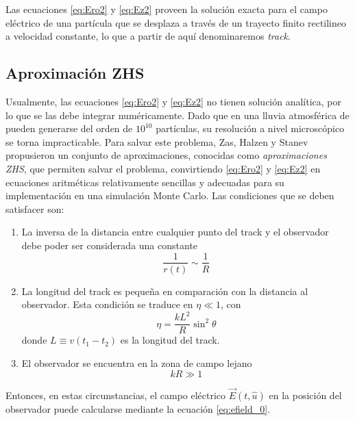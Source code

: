 Las ecuaciones \ref{eq:Ero2} y \ref{eq:Ez2} proveen la soluci\'on exacta para el campo el\'ectrico de una part\'icula que se desplaza a trav\'es de un trayecto finito rectilineo a velocidad constante, lo que a partir de aqu\'i denominaremos \emph{track}.

\subsection{Aproximaci\'on ZHS}
\label{sbsc:zhs_approx}

Usualmente, las ecuaciones \ref{eq:Ero2} y \ref{eq:Ez2} no tienen soluci\'on anal\'itica, por lo que se las debe integrar num\'ericamente.
Dado que en una lluvia atmosf\'erica de  pueden generarse del orden de $10^{10}$ part\'iculas, su resoluci\'on a nivel microsc\'opico se torna impracticable.
Para salvar este problema, Zas, Halzen y Stanev~\cite{1_halzen_zas_stanev_1991,2_zas_halzen_stanev_1992} propusieron un conjunto de aproximaciones, conocidas como \emph{aproximaciones ZHS}, que permiten salvar el problema, convirtiendo \ref{eq:Ero2} y \ref{eq:Ez2} en ecuaciones aritm\'eticas relativamente sencillas y adecuadas para su implementaci\'on en una simulaci\'on Monte Carlo. Las condiciones que se deben satisfacer son:
	\begin{enumerate}
		\item La inversa de la distancia entre cualquier punto del track y el observador debe poder ser considerada una constante
		\begin{equation}
		\frac{1}{r(t)}\sim\frac{1}{R}
		\end{equation}
		\item La longitud del track es peque\~na en comparaci\'on con la distancia al observador. Esta condici\'on se traduce en $\eta\ll1$, con
		\begin{equation}
		\eta = \frac{k L^2}{R}\sin^2\theta
		\end{equation}
		donde $L\equiv v(t_1-t_2)$ es la longitud del track.
		\item El observador se encuentra en la zona de campo lejano
		\begin{equation}
		kR\gg1
		\end{equation}
	\end{enumerate}
	Entonces, en estas circunstancias, el campo el\'ectrico $\vec{E}(t,\hat{u})$ en la posici\'on del observador puede calcularse mediante la ecuaci\'on \ref{eq:efield_0}.
